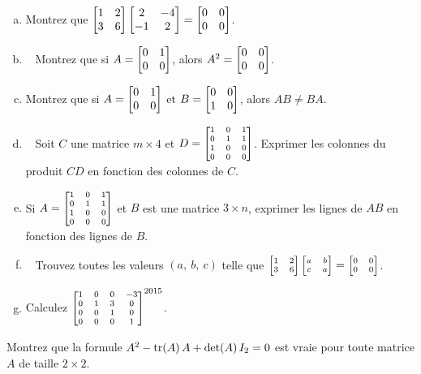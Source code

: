 \begin{prob}
\begin{enumerate}[a)]
\item Montrez que $
\bmatrix 1&2\\ 3&6\endbmatrix \bmatrix 2&-4\\ -1&2\endbmatrix=\bmatrix0&0\cr 0&0\endbmatrix$.
\medskip
 
\item\sov~ Montrez que si $A=
\bmatrix 0&1\\ 0&0\endbmatrix$, alors $A^2=\bmatrix0&0\cr 0&0\endbmatrix$. 
\medskip
 
\item Montrez que si $A=
\bmatrix 0&1\\ 0&0\endbmatrix$ et $B=\bmatrix 0&0\\ 1&0\endbmatrix$, alors $AB \not= BA$. 
\medskip
 
\item\sov~ Soit $C$ une matrice $m\times 4$ et $D  =\scriptsize\bmatrix 1&0&1\\0&1&1\\ 1&0&0\\0&0&0 \endbmatrix $. Exprimer les colonnes du produit $CD$ en fonction des colonnes de $C$.
\medskip
 
\item Si $A=\scriptsize\bmatrix 1&0&1\\0&1&1\\ 1&0&0\\0&0&0 \endbmatrix  $ et $B$ est une matrice $3\times n$, exprimer les lignes de $AB$ en fonction des lignes de $B$.
\medskip
 
\item\sov~  Trouvez toutes les valeurs $ (a,\ b,\ c)$ telle que $\scriptsize\bmatrix 1&
2\\ 3&6\endbmatrix \bmatrix a&b\\ c&a\endbmatrix=\bmatrix0&0\cr 0&0\endbmatrix
 $.
\medskip
 
\item Calculez $ \scriptsize\bmatrix  1&0&0&-3\\ 0&1&3&0\\ 0&0&1&0
\\ 0&0&0&1
\endbmatrix^{2015}$.
\medskip
 
\end{enumerate}
 \end{prob}
\begin{prob}
\label{prob14.2}
Montrez que la formule $A^2 - \operatorname{ tr}(A)\,A + \det(A)\,I_2 = 0$ est vraie pour toute matrice $A$ de taille $2\times 2$.
\end{prob}

